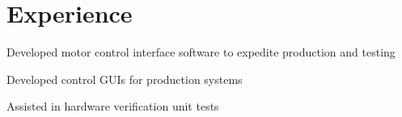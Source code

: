 \documentclass[]{deedy-resume-reversed}
\begin{document}
\begin{minipage}[t]{0.66\textwidth} 


\section{Experience}

\vspace{\topsep} %
\begin{tightemize}
	\item Developed motor control interface software to expedite production and testing
	\item Developed control GUIs for production systems
	\item Assisted in hardware verification unit tests
	
\end{tightemize}
\sectionsep


\end{minipage}
\end{document}
